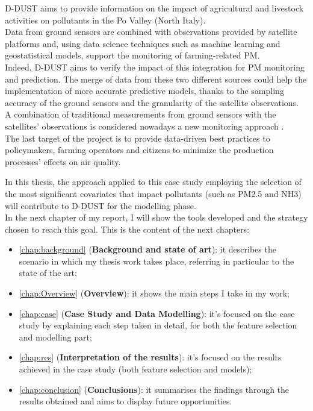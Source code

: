 D-DUST aims to provide information on the impact of agricultural and livestock activities on pollutants in the Po Valley (North Italy).\\
Data from ground sensors are combined with observations provided by satellite platforms and, using data science techniques such as machine learning and geostatistical models, support the monitoring of farming-related PM.\\
Indeed, D-DUST aims to verify the impact of this integration for PM monitoring and prediction. 
The merge of data from these two different sources could help the implementation of more accurate predictive models, thanks to the sampling accuracy of the ground sensors and the granularity of the satellite observations.\\
A combination of traditional measurements from ground sensors with the satellites' observations is considered nowadays a new monitoring approach \cite{de2018modelling}.\\
The last target of the project is to provide data-driven best practices to policymakers, farming operators and citizens to minimize the production processes' effects on air quality.\par
In this thesis, the approach applied to this case study employing the selection of the most significant covariates that impact pollutants (such as PM2.5 and NH3) will contribute to D-DUST for the modelling phase.\\
In the next chapter of my report, I will show the tools developed and the strategy chosen to reach this goal. 
This is the content of the next chapters:

\begin{itemize}
  \item \autoref{chap:background} (\textbf{Background and state of art}): it describes the scenario in which my thesis work takes place, referring in particular to the state of the art;
  \item \autoref{chap:Overview} (\textbf{Overview}): it shows the main steps I take in my work;
  \item \autoref{chap:case} (\textbf{Case Study and Data Modelling}): it's focused on the case study by explaining each step taken in detail, for both the feature selection and modelling part;
 \item \autoref{chap:res} (\textbf{Interpretation of the results}): it's focused on the results achieved in the case study (both feature selection and models);
 \item \autoref{chap:conclusion} (\textbf{Conclusions}): it summarises the findings through the results obtained and aims to display future opportunities.  
\end{itemize}